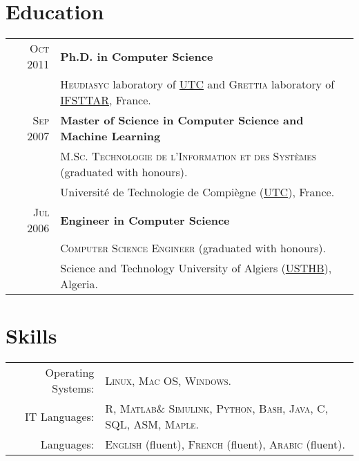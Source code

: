 \documentclass[a4paper,10pt]{article}
\begin{document}
\begin{tabular}{r|p{14cm}}

\end{tabular}

\section{\textcolor{RedOrange}{Education}}
\begin{tabular}{rp{13.8cm}}	
 \textsc{Oct 2011}  & \textbf{Ph.D. in Computer Science}\\
 &\textsc{Heudiasyc} laboratory of \href{http://www.utc.fr/the_university/index.php}{UTC} and \textsc{Grettia} laboratory of \href{http://www.ifsttar.fr}{IFSTTAR}, France.\\


\textsc{Sep 2007}& \textbf{Master of Science in Computer Science and Machine Learning}\\
& \textsc{M.Sc. Technologie de l'Information et des Syst\`emes} (graduated with honours). \\
& Universit\'e de Technologie de Compi\`egne (\href{http://www.utc.fr/the_university/index.php}{UTC}), France. \\

\textsc{Jul 2006} & \textbf{Engineer in Computer Science}\\
 & \textsc{Computer Science Engineer} (graduated with honours). \\
 & Science and Technology University of Algiers (\href{http://www.usthb.dz}{USTHB}), Algeria.\\

\end{tabular}



\section{\textcolor{RedOrange}{Skills}}
\begin{tabular}{rp{13.8cm}}
Operating Systems:& \textsc{Linux, Mac OS, Windows}.\\
IT Languages:& \textsc{R, Matlab\& Simulink, Python, Bash, Java, C, SQL, ASM, Maple}.\\


Languages:& \textsc{English} (fluent), \textsc{French} (fluent), \textsc{Arabic} (fluent).
\end{tabular}
\end{document}
